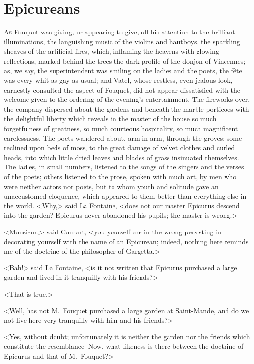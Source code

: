 \chapter{Epicureans}

\lettrine{A}{s} Fouquet was giving, or appearing to give, all his attention to the brilliant illuminations, the languishing music of the violins and hautboys, the sparkling sheaves of the artificial fires, which, inflaming the heavens with glowing reflections, marked behind the trees the dark profile of the donjon of Vincennes; as, we say, the superintendent was smiling on the ladies and the poets, the fête was every whit as gay as usual; and Vatel, whose restless, even jealous look, earnestly consulted the aspect of Fouquet, did not appear dissatisfied with the welcome given to the ordering of the evening's entertainment. The fireworks over, the company dispersed about the gardens and beneath the marble porticoes with the delightful liberty which reveals in the master of the house so much forgetfulness of greatness, so much courteous hospitality, so much magnificent carelessness. The poets wandered about, arm in arm, through the groves; some reclined upon beds of moss, to the great damage of velvet clothes and curled heads, into which little dried leaves and blades of grass insinuated themselves. The ladies, in small numbers, listened to the songs of the singers and the verses of the poets; others listened to the prose, spoken with much art, by men who were neither actors nor poets, but to whom youth and solitude gave an unaccustomed eloquence, which appeared to them better than everything else in the world. <Why,> said La Fontaine, <does not our master Epicurus descend into the garden? Epicurus never abandoned his pupils; the master is wrong.>

<Monsieur,> said Conrart, <you yourself are in the wrong persisting in decorating yourself with the name of an Epicurean; indeed, nothing here reminds me of the doctrine of the philosopher of Gargetta.>

<Bah!> said La Fontaine, <is it not written that Epicurus purchased a large garden and lived in it tranquilly with his friends?>

<That is true.>

<Well, has not M.~Fouquet purchased a large garden at Saint-Mande, and do we not live here very tranquilly with him and his friends?>

<Yes, without doubt; unfortunately it is neither the garden nor the friends which constitute the resemblance. Now, what likeness is there between the doctrine of Epicurus and that of M.~Fouquet?>


